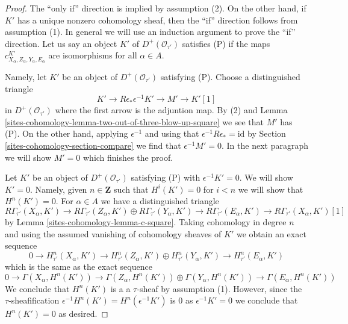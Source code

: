 \begin{proof}
The ``only if'' direction is implied by assumption (2).
On the other hand, if $K'$ has a unique nonzero cohomology sheaf,
then the ``if'' direction follows from assumption (1).
In general we will use an induction argument to prove the
``if'' direction. Let us say an object $K'$ of $D^+(\mathcal{O}_{\tau'})$
satisfies (P) if the maps $c^{K'}_{X_\alpha, Z_\alpha, Y_\alpha, E_\alpha}$
are isomorphisms for all $\alpha \in A$.

\medskip\noindent
Namely, let $K'$ be an object of $D^+(\mathcal{O}_{\tau'})$
satisfying (P). Choose a distinguished triangle
$$
K' \to R\epsilon_*\epsilon^{-1}K' \to M' \to K'[1]
$$
in $D^+(\mathcal{O}_{\tau'})$ where the first arrow is the adjuntion map.
By (2) and Lemma \ref{sites-cohomology-lemma-two-out-of-three-blow-up-square}
we see that $M'$ has (P). On the other hand, applying
$\epsilon^{-1}$ and using that $\epsilon^{-1}R\epsilon_* = \text{id}$
by Section \ref{sites-cohomology-section-compare} we find that $\epsilon^{-1}M' = 0$.
In the next paragraph we will show $M' = 0$ which finishes the proof.

\medskip\noindent
Let $K'$ be an object of $D^+(\mathcal{O}_{\tau'})$
satisfying (P) with $\epsilon^{-1}K' = 0$. We will show $K' = 0$.
Namely, given $n \in \mathbf{Z}$ such that $H^i(K') = 0$
for $i < n$ we will show that $H^n(K') = 0$.
For $\alpha \in A$ we have a distinguished triangle
$$
R\Gamma_{\tau'}(X_\alpha, K') \to
R\Gamma_{\tau'}(Z_\alpha, K') \oplus
R\Gamma_{\tau'}(Y_\alpha, K') \to
R\Gamma_{\tau'}(E_\alpha, K') \to
R\Gamma_{\tau'}(X_\alpha, K')[1]
$$
by Lemma \ref{sites-cohomology-lemma-c-square}. Taking cohomology in degree $n$ and using
the assumed vanishing of cohomology sheaves of $K'$ we obtain an exact
sequence
$$
0 \to
H^n_{\tau'}(X_\alpha, K') \to
H^n_{\tau'}(Z_\alpha, K') \oplus
H^n_{\tau'}(Y_\alpha, K') \to
H^n_{\tau'}(E_\alpha, K')
$$
which is the same as the exact sequence
$$
0 \to
\Gamma(X_\alpha, H^n(K')) \to
\Gamma(Z_\alpha, H^n(K')) \oplus
\Gamma(Y_\alpha, H^n(K')) \to
\Gamma(E_\alpha, H^n(K'))
$$
We conclude that $H^n(K')$ is a a $\tau$-sheaf by assumption (1).
However, since the $\tau$-sheafification
$\epsilon^{-1}H^n(K') = H^n(\epsilon^{-1}K')$ is $0$ as
$\epsilon^{-1}K' = 0$
we conclude that $H^n(K') = 0$ as desired.
\end{proof}

